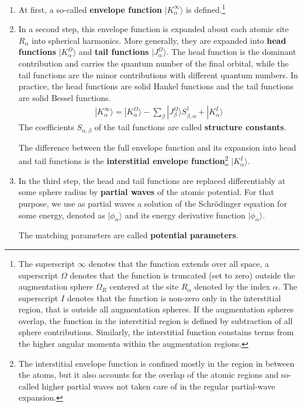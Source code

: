 \documentclass[11pt,a4paper]{report}
\begin{document}
\begin{enumerate}
\item At first, a so-called \textbf{envelope function} $|K^\infty_\alpha\rangle$ is defined.\footnote{The
  superscript $\infty$ denotes that the function extends over all
  space, a superscript $\Omega$ denotes that the function is truncated
  (set to zero) outside the augmentation sphere $\Omega_{R}$ centered
  at the site $R_\alpha$ denoted by the index $\alpha$. The
  superscript $I$ denotes that the function is non-zero only in the
  interstitial region, that is outside all augmentation spheres. If
  the augmentation spheres overlap, the function in the interstitial
  region is defined by subtraction of all sphere
  contributions. Similarly, the interstitial function constains terms
  from the higher angular momenta within the augmentation regions.}
%
\item In a second step, this envelope function is expanded about each
  atomic site $R_\alpha$ into spherical harmonics.  More generally,
  they are expanded into \textbf{head functions}
  $|K^\Omega_\alpha\rangle$ and \textbf{tail functions} $|J^\Omega_\alpha\rangle$. The head function is the
  dominant contribution and carries the quantum number of the final
  orbital, while the tail functions are the minor contributions with
  different quantum numbers. In practice, the head functions are solid
  Hankel functions and the tail functions are solid Bessel functions.
\begin{eqnarray}
|K_{\alpha}^\infty\rangle=|K^\Omega_{\alpha}\rangle
-\sum_{\beta}|J^\Omega_{\beta}\rangle S^\dagger_{\beta,\alpha}
+|K^I_{\alpha}\rangle
\end{eqnarray}
   The coefficients $S_{\alpha,\beta}$ of the tail functions are
   called \textbf{structure constants}.

  The difference between the full envelope function and its expansion
  into head and tail functions is the \textbf{interstitial envelope
    function}\footnote{The
    interstitial envelope function is confined mostly in the region in
    between the atoms, but it also accounts for the overlap of the
    atomic regions and so-called higher partial waves not taken care of
    in the regular partial-wave expansion.}  $|K^I_\alpha\rangle$.
%
\item In the third step, the head and tail functions are replaced
  differentiably at some sphere radius by \textbf{partial
    waves} of the atomic potential. For that
  purpose, we use as partial waves a solution of the Schr\"odinger
  equation for some energy, denoted as $|\phi_{\alpha}\rangle$ and its
  energy derivative function $|\dot{\phi}_\alpha\rangle$.

  The matching parameters are called \textbf{potential
    parameters}.
\end{enumerate}
\end{document}
